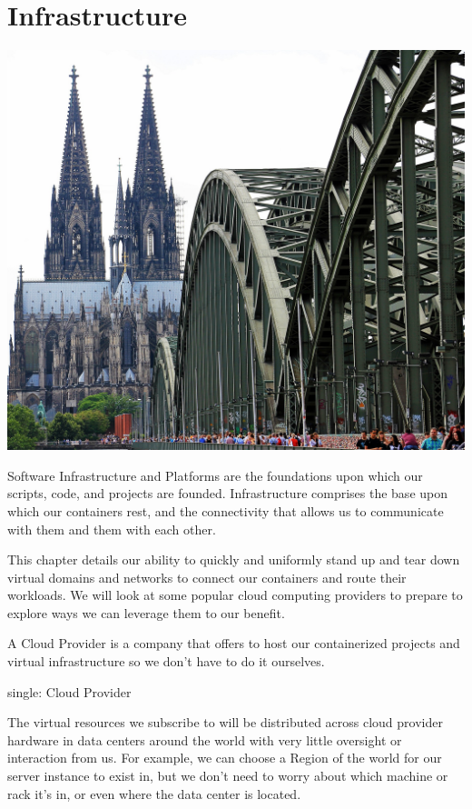 \chapter{Infrastructure}

\justify
\includegraphics{../images/cologne-cathedral-1507854_1920.jpg}

\justify
Software Infrastructure and Platforms are the foundations upon which our
scripts, code, and projects are founded. Infrastructure comprises the
base upon which our containers rest, and the connectivity that allows us
to communicate with them and them with each other.

\justify
This chapter details our ability to quickly and uniformly stand up and
tear down virtual domains and networks to connect our containers and
route their workloads. We will look at some popular cloud computing
providers to prepare to explore ways we can leverage them to our
benefit.

\justify
A Cloud Provider is a company that offers to host our containerized
projects and virtual infrastructure so we don't have to do it ourselves.

single: Cloud Provider

\justify
The virtual resources we subscribe to will be distributed across cloud
provider hardware in data centers around the world with very little
oversight or interaction from us. For example, we can choose a Region of
the world for our server instance to exist in, but we don't need to
worry about which machine or rack it's in, or even where the data center
is located.


